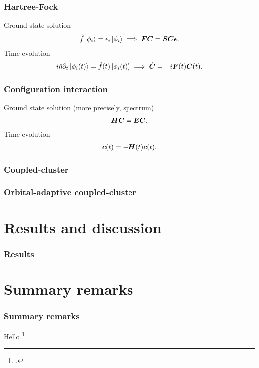 \documentclass{beamer}
\begin{document}
\begin{frame}
    \frametitle{Hartree-Fock}
    Ground state solution
    \begin{gather}
        \hat{f}\ket*{\phi_i} = \epsilon_i\ket*{\phi_i}
        \implies
        \boldsymbol{F}\boldsymbol{C}
        = \boldsymbol{S}\boldsymbol{C}\boldsymbol{\epsilon}.
    \end{gather}
    Time-evolution
    \begin{gather}
        i\hslash\partial_t\ket*{\phi_i(t)}
        = \hat{f}(t)\ket*{\phi_i(t)}
        \implies
        \dot{\boldsymbol{C}} = -i\boldsymbol{F}(t)\boldsymbol{C}(t).
    \end{gather}
\end{frame}

\begin{frame}
    \frametitle{Configuration interaction}
    Ground state solution (more precisely, spectrum)
    \begin{align}
        \boldsymbol{H}\boldsymbol{C} = \boldsymbol{E}\boldsymbol{C}.
    \end{align}
    Time-evolution
    \begin{align}
        \dot{\boldsymbol{c}}(t) = -\boldsymbol{H}(t)\boldsymbol{c}(t).
    \end{align}
\end{frame}

\begin{frame}
    \frametitle{Coupled-cluster}
\end{frame}

\begin{frame}
    \frametitle{Orbital-adaptive coupled-cluster}
\end{frame}

\section{Results and discussion}

\begin{frame}
    \frametitle{Results}
\end{frame}

\section{Summary remarks}

\begin{frame}
    \frametitle{Summary remarks}
\end{frame}

\begin{frame}
    Hello \footcite{pedersen2018symplectic}
\end{frame}
\end{document}
